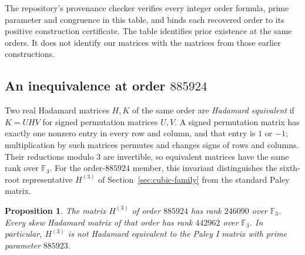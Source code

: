 \documentclass[10pt]{article}
\newtheorem{proposition}[theorem]{Proposition}
\newcommand{\F}{\mathbb F}
\begin{document}
The repository's provenance checker verifies every integer order formula,
prime parameter and congruence in this table, and binds each recovered
order to its positive construction certificate. The table identifies
prior existence at the same orders. It does not identify our matrices
with the matrices from those earlier constructions.

\subsection{An inequivalence at order \texorpdfstring{$885924$}{885924}}

Two real Hadamard matrices $H,K$ of the same order are
\emph{Hadamard equivalent} if $K=UHV$ for signed permutation matrices
$U,V$. A signed permutation matrix has exactly one nonzero entry in
every row and column, and that entry is $1$ or $-1$; multiplication by
such matrices permutes and changes signs of rows and columns.
Their reductions modulo $3$ are invertible, so equivalent matrices
have the same rank over $\F_3$.
For the order-$885924$ member, this invariant distinguishes the
sixth-root representative $H^{(3)}$ of Section~\ref{sec:cubic-family}
from the standard Paley matrix.

\begin{proposition}\label{prop:inequivalent-paley}
The matrix $H^{(3)}$ of order $885924$ has rank $246090$ over $\F_3$.
Every skew Hadamard matrix of that order has rank $442962$ over $\F_3$.
In particular, $H^{(3)}$ is not Hadamard equivalent to the Paley I
matrix with prime parameter $885923$.
\end{proposition}
\end{document}
